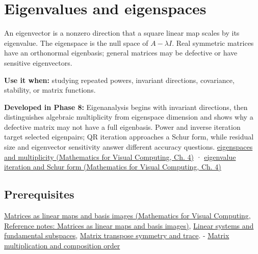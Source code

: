 \hypertarget{appendix-0b3be18411f9}{}\label{referencestart:appendix-0b3be18411f9}
\section{Eigenvalues and eigenspaces}\label{appendix-0b3be18411f9-eigenvalues-and-eigenspaces}

\hypertarget{appendix-0b3be18411f9-eigenvalues-and-eigenspaces}{}

An eigenvector is a nonzero direction that a square linear map scales by its eigenvalue. The eigenspace is the null space of \(A-\lambda I\). Real symmetric matrices have an orthonormal eigenbasis; general matrices may be defective or have sensitive eigenvectors.

\textbf{Use it when:} studying repeated powers, invariant directions, covariance, stability, or matrix functions.

\textbf{Developed in Phase 8:} Eigenanalysis begins with invariant directions, then distinguishes algebraic multiplicity from eigenspace dimension and shows why a defective matrix may not have a full eigenbasis. Power and inverse iteration target selected eigenpairs; QR iteration approaches a Schur form, while residual size and eigenvector sensitivity answer different accuracy questions. \href{../02-Mathematics-for-Visual-Computing/main.pdf\#nameddest=01-foundations-i-ch020-eigenvalues-eigenspaces-and-the-two-kinds-of-multiplicity}{eigenspaces and multiplicity (Mathematics for Visual Computing, Ch. 4)} · \href{../02-Mathematics-for-Visual-Computing/main.pdf\#nameddest=01-foundations-i-ch020-qr-iteration-and-jacobi-rotations-preserve-the-spectrum-while-simplifying-shape}{eigenvalue iteration and Schur form (Mathematics for Visual Computing, Ch. 4)}

\subsection{Prerequisites}\label{appendix-0b3be18411f9-prerequisites}

\hypertarget{appendix-0b3be18411f9-prerequisites}{}

\href{../02-Mathematics-for-Visual-Computing/main.pdf\#nameddest=appendix-bd39c3bf5d64}{Matrices as linear maps and basis images (Mathematics for Visual Computing, Reference notes: Matrices as linear maps and basis images)}, \hyperref[appendix-8572a4a060c1]{Linear systems and fundamental subspaces}, \hyperref[appendix-175ca5ff874d]{Matrix transpose symmetry and trace}. - \hyperref[appendix-ab31ef447dbf]{Matrix multiplication and composition order}

